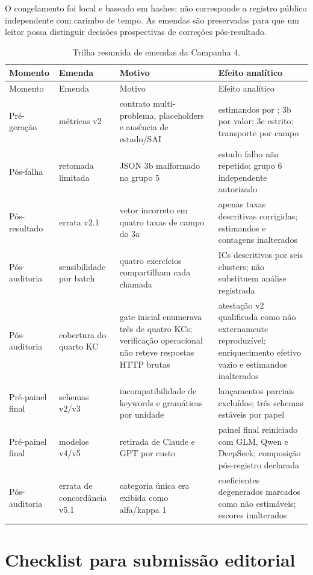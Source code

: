 \documentclass[11pt,a4paper]{article}
\begin{document}
O congelamento foi local e baseado em hashes; não corresponde a registro público independente com carimbo de tempo. As emendas são preservadas para que um leitor possa distinguir decisões prospectivas de correções pós-resultado.

\begingroup
\small
\setlength{\tabcolsep}{3pt}
\begin{longtable}{@{}P{1.9cm}P{2.8cm}P{5.3cm}P{3.6cm}@{}}
\caption{Trilha resumida de emendas da Campanha 4.}\label{tab:amendments}\\
\toprule
Momento & Emenda & Motivo & Efeito analítico \\
\midrule
\endfirsthead
\toprule
Momento & Emenda & Motivo & Efeito analítico \\
\midrule
\endhead
Pré-geração & métricas v2 & contrato multi-problema, placeholders e ausência de estado/SAI & estimandos por ; 3b por valor; 3c estrito; transporte por campo \\
Pós-falha & retomada limitada & JSON 3b malformado no grupo 5 & estado falho não repetido; grupo 6 independente autorizado \\
Pós-resultado & errata v2.1 & vetor incorreto em quatro taxas de campo do 3a & apenas taxas descritivas corrigidas; estimandos e contagens inalterados \\
Pós-auditoria & sensibilidade por batch & quatro exercícios compartilham cada chamada & ICs descritivos por seis clusters; não substituem análise registrada \\
Pós-auditoria & cobertura do quarto KC & gate inicial enumerava três de quatro KCs; verificação operacional não reteve respostas HTTP brutas & atestação v2 qualificada como não externamente reproduzível; enriquecimento efetivo vazio e estimandos inalterados \\
Pré-painel final & schemas v2/v3 & incompatibilidade de keywords e gramáticas por unidade & lançamentos parciais excluídos; três schemas estáveis por papel \\
Pré-painel final & modelos v4/v5 & retirada de Claude e GPT por custo & painel final reiniciado com GLM, Qwen e DeepSeek; composição pós-registro declarada \\
Pós-auditoria & errata de concordância v5.1 & categoria única era exibida como alfa/kappa 1 & coeficientes degenerados marcados como não estimáveis; escores inalterados \\
\bottomrule
\end{longtable}
\endgroup

\section{Checklist para submissão editorial}
\end{document}
